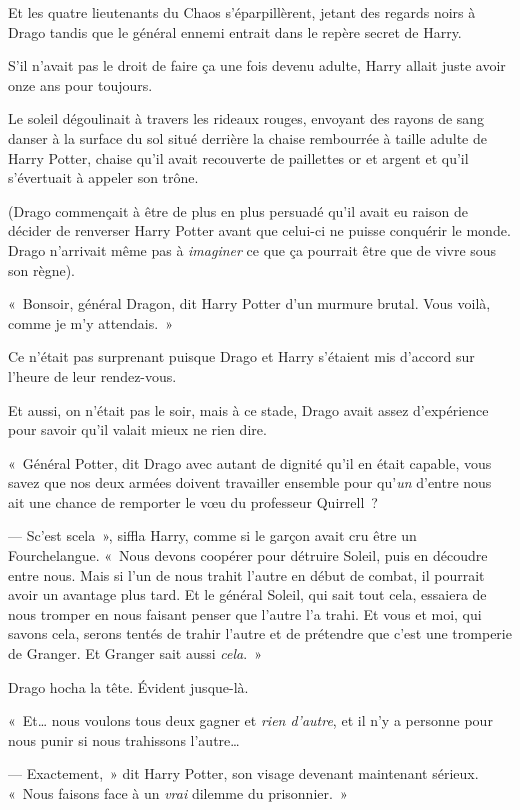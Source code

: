 Et les quatre lieutenants du Chaos s'éparpillèrent, jetant des regards noirs à Drago tandis que le général ennemi entrait dans le repère secret de Harry.

S'il n'avait pas le droit de faire ça une fois devenu adulte, Harry allait juste avoir onze ans pour toujours.

\later

Le soleil dégoulinait à travers les rideaux rouges, envoyant des rayons de sang danser à la surface du sol situé derrière la chaise rembourrée à taille adulte de Harry Potter, chaise qu'il avait recouverte de paillettes or et argent et qu'il s'évertuait à appeler son trône.

(Drago commençait à être de plus en plus persuadé qu'il avait eu raison de décider de renverser Harry Potter avant que celui-ci ne puisse conquérir le monde. Drago n'arrivait même pas à \emph{imaginer} ce que ça pourrait être que de vivre sous son règne).

«~Bonsoir, général Dragon, dit Harry Potter d'un murmure brutal. Vous voilà, comme je m'y attendais.~»

Ce n'était pas surprenant puisque Drago et Harry s'étaient mis d'accord sur l'heure de leur rendez-vous.

Et aussi, on n'était pas le soir, mais à ce stade, Drago avait assez d'expérience pour savoir qu'il valait mieux ne rien dire.

«~Général Potter, dit Drago avec autant de dignité qu'il en était capable, vous savez que nos deux armées doivent travailler ensemble pour qu'\emph{un} d'entre nous ait une chance de remporter le vœu du professeur Quirrell~?

--- Sc'est scela~», siffla Harry, comme si le garçon avait cru être un Fourchelangue. «~Nous devons coopérer pour détruire Soleil, puis en découdre entre nous. Mais si l'un de nous trahit l'autre en début de combat, il pourrait avoir un avantage plus tard. Et le général Soleil, qui sait tout cela, essaiera de nous tromper en nous faisant penser que l'autre l'a trahi. Et vous et moi, qui savons cela, serons tentés de trahir l'autre et de prétendre que c'est une tromperie de Granger. Et Granger sait aussi \emph{cela}.~»

Drago hocha la tête. Évident jusque-là.

«~Et… nous voulons tous deux gagner et \emph{rien d'autre}, et il n'y a personne pour nous punir si nous trahissons l'autre…

--- Exactement,~» dit Harry Potter, son visage devenant maintenant sérieux. «~Nous faisons face à un \emph{vrai} dilemme du prisonnier.~»

